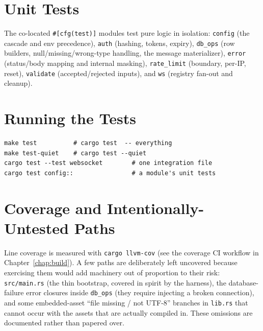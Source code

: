 \section{Unit Tests}

The co-located \verb|#[cfg(test)]| modules test pure logic in isolation:
\verb|config| (the cascade and env precedence), \verb|auth| (hashing, tokens,
expiry), \verb|db_ops| (row builders, null/missing/wrong-type handling, the
message materializer), \verb|error| (status/body mapping and internal masking),
\verb|rate_limit| (boundary, per-IP, reset), \verb|validate| (accepted/rejected
inputs), and \verb|ws| (registry fan-out and cleanup).

\section{Running the Tests}

\begin{lstlisting}
make test          # cargo test  -- everything
make test-quiet    # cargo test --quiet
cargo test --test websocket        # one integration file
cargo test config::                # a module's unit tests
\end{lstlisting}

\section{Coverage and Intentionally-Untested Paths}

Line coverage is measured with \verb|cargo llvm-cov| (see the coverage CI
workflow in Chapter~\ref{chap:build}). A few paths are deliberately left
uncovered because exercising them would add machinery out of proportion to their
risk: \verb|src/main.rs| (the thin bootstrap, covered in spirit by the harness),
the database-failure error closures inside \verb|db_ops| (they require injecting a
broken connection), and some embedded-asset ``file missing / not UTF-8'' branches
in \verb|lib.rs| that cannot occur with the assets that are actually compiled in.
These omissions are documented rather than papered over.
